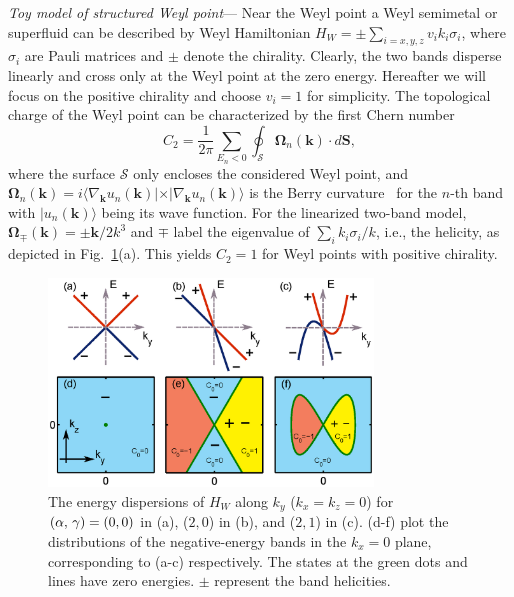 \documentclass[prl,aps,twocolumn,showpacs,floatfix]{revtex4}
\begin{document}
\emph{Toy model of structured Weyl point}--- Near the Weyl point a Weyl
semimetal or superfluid can be described by Weyl Hamiltonian $%
H_{W}=\pm\sum\nolimits_{i=x,y,z}v_{i}k_{i}\sigma _{i}$, where $\sigma_{i}$
are Pauli matrices and $\pm $ denote the chirality. Clearly, the two bands
disperse linearly and cross only at the Weyl point at the zero energy.
Hereafter we will focus on the positive chirality and choose $v_{i}=1$ for
simplicity. The topological charge of the Weyl point can be characterized by
the first Chern number
\begin{equation}
C_2=\frac{1}{2\pi}\sum_{E_{n}<0}\oint_{\mathcal{S}}{\bm \Omega}_{n}(\bm %
k)\cdot d{\bm S},  \label{ChernEq}
\end{equation}
where the surface $\mathcal{S}$ only encloses the considered Weyl point, and
${\bm \Omega}_{n}(\bm k)=i\langle \nabla_{\bm k} u_{n}(\bm k)|\times
|\nabla_{\bm k} u_{n}(\bm k)\rangle$ is the Berry curvature~\cite{XiaoRMP}
for the $n$-th band with $|u_{n}(\bm k)\rangle$ being its wave function. For
the linearized two-band model, ${\bm \Omega}_{\mp}(\bm k)=\pm{\bm k}/2k^{3}$
and $\mp$ label the eigenvalue of $\sum_{i}k_{i}\sigma _{i}/k$, i.e., the
helicity, as depicted in Fig.~\ref{WeylScheme}(a). This yields $C_2=1$ for
Weyl points with positive chirality.

\begin{figure}[t]
\includegraphics[width=3.4in]{Fig1.eps}
\caption{The energy dispersions of $H_W$ along $k_{y}$ ($k_x=k_z=0$) for $(%
\protect\alpha,\,\protect\gamma)=(0,0)$ in (a), ($2,0$) in (b), and ($2,1$)
in (c). (d-f) plot the distributions of the negative-energy bands in the $%
k_{x}=0$ plane, corresponding to (a-c) respectively. The states at the green
dots and lines have zero energies. $\pm$ represent the band helicities.}
\label{WeylScheme}
\end{figure}
\end{document}
